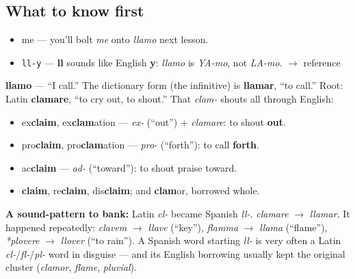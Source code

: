\subsection*{What to know first}
\begin{itemize}
\raggedright
  \item me — you'll bolt \emph{me} onto \emph{llamo} next lesson.
\end{itemize}

\begin{sounds}
\begin{itemize}
\raggedright
  \item \texttt{ll-y} — \textbf{ll} sounds like English \textbf{y}: \emph{llamo} is \emph{YA-mo}, not \emph{LA-mo}. $\to$ reference
\end{itemize}
\end{sounds}

\begin{cousinweb}
\textbf{llamo} — \textquotedblleft{}I call.\textquotedblright{} The dictionary form (the infinitive) is \textbf{llamar}, \textquotedblleft{}to call.\textquotedblright{} Root: Latin \textbf{clamare}, \textquotedblleft{}to cry out, to shout.\textquotedblright{} That \emph{clam-} shouts all through English:

\begin{itemize}
\raggedright
  \item ex\textbf{claim}, ex\textbf{clam}ation — \emph{ex-} (\textquotedblleft{}out\textquotedblright{}) + \emph{clamare}: to shout \textbf{out}.
  \item pro\textbf{claim}, pro\textbf{clam}ation — \emph{pro-} (\textquotedblleft{}forth\textquotedblright{}): to call \textbf{forth}.
  \item ac\textbf{claim} — \emph{ad-} (\textquotedblleft{}toward\textquotedblright{}): to shout praise toward.
  \item \textbf{claim}, re\textbf{claim}, dis\textbf{claim}; and \textbf{clam}or, borrowed whole.
\end{itemize}

\textbf{A sound-pattern to bank:} Latin \emph{cl-} became Spanish \emph{ll-}. \emph{clamare} $\to$ \emph{llamar}. It happened repeatedly: \emph{clavem} $\to$ \emph{llave} (\textquotedblleft{}key\textquotedblright{}), \emph{flamma} $\to$ \emph{llama} (\textquotedblleft{}flame\textquotedblright{}), \emph{*plovere} $\to$ \emph{llover} (\textquotedblleft{}to rain\textquotedblright{}). A Spanish word starting \emph{ll-} is very often a Latin \emph{cl-}/\emph{fl-}/\emph{pl-} word in disguise — and its English borrowing usually kept the original cluster (\emph{clamor}, \emph{flame}, \emph{pluvial}).
\end{cousinweb}

